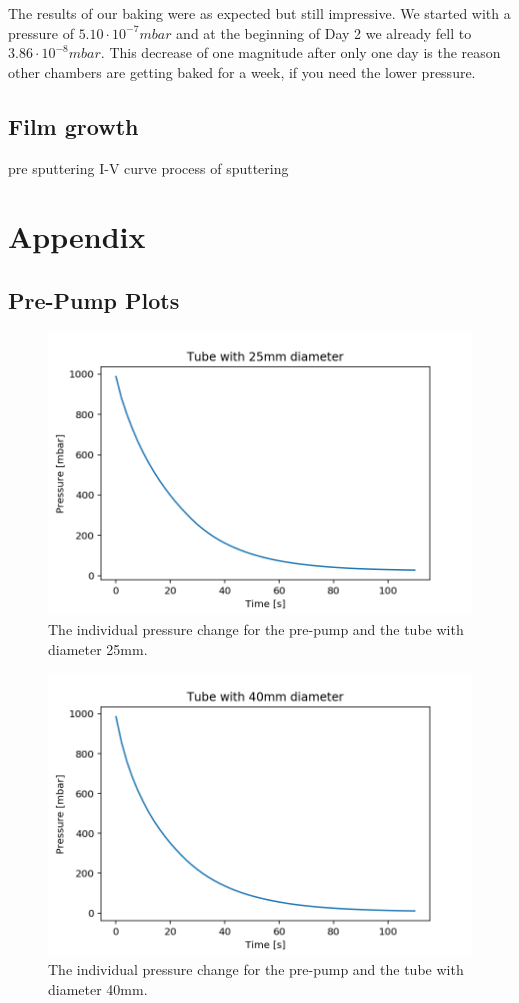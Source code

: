\documentclass[]{article}
\begin{document}
The results of our baking were as expected but still impressive. We started with a pressure of $5.10 \cdot 10^{-7} mbar$ and at the beginning of Day 2 we already fell to $3.86 \cdot 10^{-8} mbar $. This decrease of one magnitude after only one day is the reason other chambers are getting baked for a week, if you need the lower pressure.

\subsection{Film growth}
pre sputtering
I-V curve 
process of sputtering 


\newpage

\section{Appendix}
\subsection{Pre-Pump Plots}
\label{Pre-Pump Plots}

\begin{figure}[!h]
\centering\includegraphics[width=.5\textwidth]{Plots/25mm.png}
\caption{The individual pressure change for the pre-pump and the tube with diameter 25mm.}
\label{fig::25mm}
\end{figure}

\begin{figure}[!h]
\centering\includegraphics[width=.5\textwidth]{Plots/40mm.png}
\caption{The individual pressure change for the pre-pump and the tube with diameter 40mm.}
\label{fig::40mm}
\end{figure}
\end{document}
